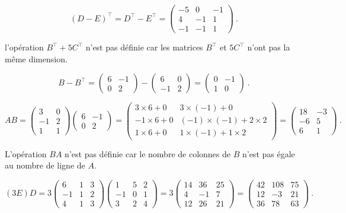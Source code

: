 {
\[
(D-E)^\top = D^\top - E^\top =
\begin{pmatrix} -5 & 0 & -1 \\ 4 & -1 & 1 \\ -1 & -1 & 1 \end{pmatrix} \ .
\]

l'opération $B^\top+5C^\top$ n'est pas définie car les matrices
$B^\top$ et $5C^\top$ n'ont pas la même dimension.

\[
B - B^\top
= \begin{pmatrix} 6 & -1 \\ 0 & 2 \end{pmatrix}
- \begin{pmatrix} 6 & 0 \\ -1 & 2 \end{pmatrix}
= \begin{pmatrix} 0 & -1 \\ 1 & 0 \end{pmatrix} \ .
\]

\[
AB = \begin{pmatrix} 3 & 0 \\ -1 & 2 \\ 1 & 1 \end{pmatrix}
\begin{pmatrix} 6 & -1 \\ 0 & 2 \end{pmatrix}
= \begin{pmatrix}
3\times 6 + 0 & 3\times (-1) + 0 \\
-1\times 6 + 0 & (-1)\times (-1) + 2\times 2 \\
1\times 6 + 0 & 1 \times  (-1) + 1 \times 2
\end{pmatrix}
= \begin{pmatrix} 18 & -3 \\ -6 & 5 \\ 6 & 1 \end{pmatrix}
\ .
\]

L'opération $BA$ n'est pas définie car le nombre de colonnes de $B$ n'est pas
égale au nombre de ligne de $A$.

\[
(3E)D = 3\begin{pmatrix} 6 & 1 & 3 \\ -1 & 1 & 2 \\ 4 & 1 & 3 \end{pmatrix}
\begin{pmatrix} 1 & 5 & 2 \\ -1 & 0 & 1 \\ 3 & 2 & 4 \end{pmatrix}
= 3 \begin{pmatrix} 14 & 36 & 25 \\ 4 & -1 & 7 \\ 12 & 26 & 21 \end{pmatrix}
=\begin{pmatrix} 42 & 108 & 75 \\ 12 & -3 & 21 \\ 36 & 78 & 63 \end{pmatrix}
\ .
\]

}
